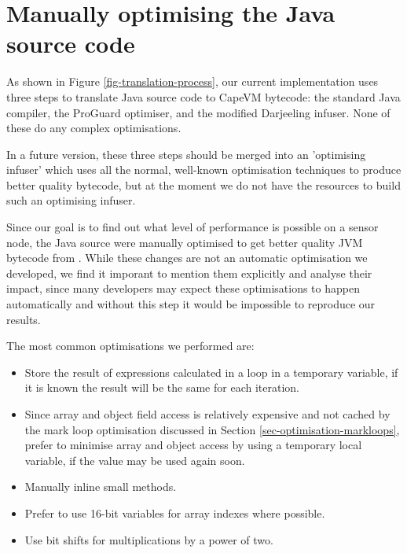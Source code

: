 \section{Manually optimising the Java source code}
\label{sec-optimisations-manual-java-source-optimisation}
As shown in Figure \ref{fig-translation-process}, our current implementation uses three steps to translate Java source code to CapeVM bytecode: the standard Java compiler, the ProGuard optimiser, and the modified Darjeeling infuser. None of these do any complex optimisations. 

In a future version, these three steps should be merged into an 'optimising infuser' which uses all the normal, well-known optimisation techniques to produce better quality bytecode, but at the moment we do not have the resources to build such an optimising infuser.

Since our goal is to find out what level of performance is possible on a sensor node, the Java source were manually optimised to get better quality JVM bytecode from . While these changes are not an automatic optimisation we developed, we find it imporant to mention them explicitly and analyse their impact, since many developers may expect these optimisations to happen automatically and without this step it would be impossible to reproduce our results.


The most common optimisations we performed are:
\begin{itemize}
	\item Store the result of expressions calculated in a loop in a temporary variable, if it is known the result will be the same for each iteration.
	\item Since array and object field access is relatively expensive and not cached by the mark loop optimisation discussed in Section \ref{sec-optimisation-markloops}, prefer to minimise array and object access by using a temporary local variable, if the value may be used again soon.
	\item Manually inline small methods.
	\item Prefer to use 16-bit variables for array indexes where possible.
	\item Use bit shifts for multiplications by a power of two.
\end{itemize}

